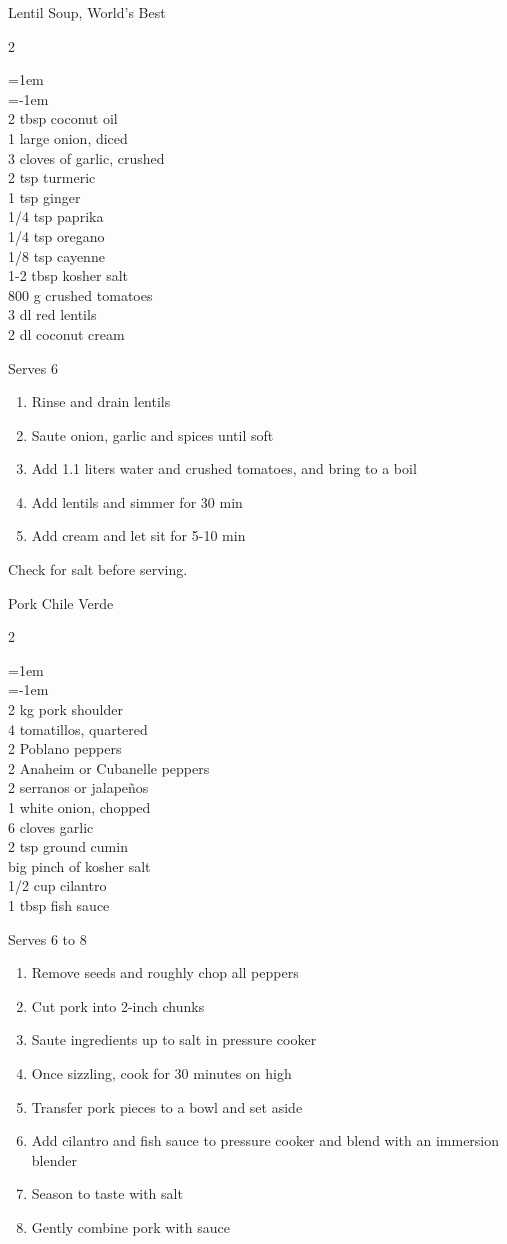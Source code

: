 \documentclass{article}
\newenvironment{recipe}[2]
    {\clearpage
    \begin{FlushLeft}
    \textrm{{\large#1}\hfill{\large\tabularnums{#2}}}
    \vspace{0.5em}
    \columnratio{0.333}
    \setlength{\columnsep}{0.2in}
    \begin{paracol}{2}}
    {\end{paracol}\end{FlushLeft}}
\newenvironment{denserecipe}[2]
    {\small
    \begin{recipe}{#1}{#2}}
    {\end{recipe}}
\newcommand{\nextcolumn}{\switchcolumn}
\newenvironment{ingredients}
    {
    \begin{obeylines}
    \vspace{\parskip}
    \setlength{\parskip}{0.25em}
    \vspace{-0.25em}
    \leftskip=1em
    \parindent=-1em}
    {\end{obeylines}}
\newenvironment{steps}
    {\begin{enumerate}[leftmargin=*,topsep=0pt]}
    {\end{enumerate}}
\newcommand{\tag}[1]{\hspace{1em}#1}
\newcommand{\symboltag}[2]{\tag{#1\hspace{0.4em}#2}}
\newcommand{\totaltime}[1]{\symboltag{\raisebox{-0.1em}{\small\StopWatchEnd}}{#1}}
\begin{document}
\begin{denserecipe}{Lentil Soup, World's Best}{\tag{V}\totaltime{1 h}}
\begin{ingredients}
2 tbsp coconut oil
1 large onion, diced
3 cloves of garlic, crushed
2 tsp turmeric
1 tsp ginger
1/4 tsp paprika
1/4 tsp oregano
1/8 tsp cayenne
1-2 tbsp kosher salt
800 g crushed tomatoes
3 dl red lentils 
2 dl coconut cream
\end{ingredients}
\nextcolumn
Serves 6
\begin{steps}
    \item Rinse and drain lentils
    \item Saute onion, garlic and spices until soft
    \item Add 1.1 liters water and crushed tomatoes, and bring to a boil
    \item Add lentils and simmer for 30 min
    \item Add cream and let sit for 5-10 min
\end{steps}
Check for salt before serving.
\end{denserecipe}

\begin{denserecipe}{Pork Chile Verde}{\totaltime{1 h 15 min}}
\begin{ingredients}
2 kg pork shoulder
4 tomatillos, quartered
2 Poblano peppers
2 Anaheim or Cubanelle peppers
2 serranos or jalapeños
1 white onion, chopped
6 cloves garlic
2 tsp ground cumin
big pinch of kosher salt
1/2 cup cilantro
1 tbsp fish sauce
\end{ingredients}
\nextcolumn
Serves 6 to 8
\begin{steps}
    \item Remove seeds and roughly chop all peppers
    \item Cut pork into 2-inch chunks
    \item Saute ingredients up to salt in pressure cooker
    \item Once sizzling, cook for 30 minutes on high
    \item Transfer pork pieces to a bowl and set aside
    \item Add cilantro and fish sauce to pressure cooker and blend with an immersion blender
    \item Season to taste with salt
    \item Gently combine pork with sauce
\end{steps}
\end{denserecipe}
\end{document}
